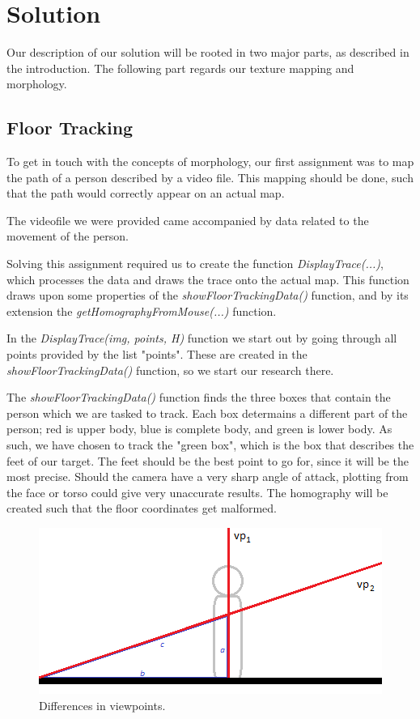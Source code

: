 \section{Solution}
Our description of our solution will be rooted in two major parts, as described in the introduction.
The following part regards our texture mapping and morphology.\newline

\subsection{Floor Tracking}
To get in touch with the concepts of morphology, our first assignment was to map the path of a person described by a video file. This mapping should be done, such that the path would correctly appear on an actual map.\newline

The videofile we were provided came accompanied by data related to the movement of the person.\newline

Solving this assignment required us to create the function \textsl{DisplayTrace(...)}, which processes the data and draws the trace onto the actual map. This function draws upon some properties of the \textsl{showFloorTrackingData()} function, and by its extension the \textsl{getHomographyFromMouse(...)} function.\newline

In the \textsl{DisplayTrace(img, points, H)} function we start out by going through all points provided by the list "points". These are created in the \textsl{showFloorTrackingData()} function, so we start our research there.\newline

The \textsl{showFloorTrackingData()} function finds the three boxes that contain the person which we are tasked to track. Each box determains a different part of the person; red is upper body, blue is complete body, and green is lower body. As such, we have chosen to track the "green box", which is the box that describes the feet of our target.
The feet should be the best point to go for, since it will be the most precise. Should the camera have a very sharp angle of attack, plotting from the face or torso could give very unaccurate results. The homography will be created such that the floor coordinates get malformed.\newline

\begin{figure}
	\centering
	\includegraphics[scale=0.9]{images/viewpointdifference.png}
	\caption{Differences in viewpoints.}
	\label{fig:viewpoints}
\end{figure}

